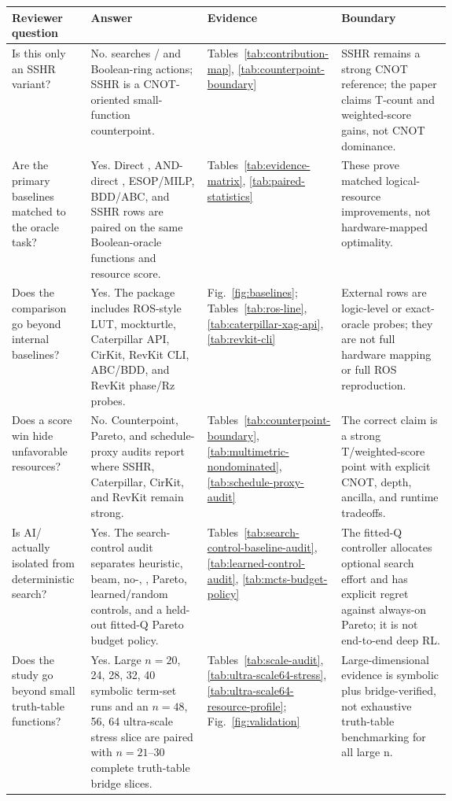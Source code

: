 \begin{tabularx}{\linewidth}{>{\raggedright\arraybackslash}p{0.18\linewidth}>{\raggedright\arraybackslash}X>{\raggedright\arraybackslash}p{0.22\linewidth}>{\raggedright\arraybackslash}p{0.25\linewidth}}
\toprule
Reviewer question & Answer & Evidence & Boundary \\
\midrule
Is this only an SSHR variant? & No. \method{} searches \anf{}/\fprm{} and Boolean-ring actions; SSHR is a CNOT-oriented small-function counterpoint. & Tables~\ref{tab:contribution-map}, \ref{tab:counterpoint-boundary} & SSHR remains a strong CNOT reference; the paper claims T-count and weighted-score gains, not CNOT dominance. \\
Are the primary baselines matched to the oracle task? & Yes. Direct \anf{}, AND-direct \anf{}, ESOP/MILP, BDD/ABC, and SSHR rows are paired on the same Boolean-oracle functions and resource score. & Tables~\ref{tab:evidence-matrix}, \ref{tab:paired-statistics} & These prove matched logical-resource improvements, not hardware-mapped optimality. \\
Does the comparison go beyond internal baselines? & Yes. The package includes ROS-style LUT, mockturtle, Caterpillar API, CirKit, RevKit CLI, ABC/BDD, and RevKit phase/Rz probes. & Fig.~\ref{fig:baselines}; Tables~\ref{tab:ros-line}, \ref{tab:caterpillar-xag-api}, \ref{tab:revkit-cli} & External rows are logic-level or exact-oracle probes; they are not full hardware mapping or full ROS reproduction. \\
Does a score win hide unfavorable resources? & No. Counterpoint, Pareto, and schedule-proxy audits report where SSHR, Caterpillar, CirKit, and RevKit remain strong. & Tables~\ref{tab:counterpoint-boundary}, \ref{tab:multimetric-nondominated}, \ref{tab:schedule-proxy-audit} & The correct claim is a strong T/weighted-score point with explicit CNOT, depth, ancilla, and runtime tradeoffs. \\
Is AI/\mcts{} actually isolated from deterministic search? & Yes. The search-control audit separates heuristic, beam, no-\mcts{}, \mcts{}, Pareto, learned/random controls, and a held-out fitted-Q Pareto budget policy. & Tables~\ref{tab:search-control-baseline-audit}, \ref{tab:learned-control-audit}, \ref{tab:mcts-budget-policy} & The fitted-Q controller allocates optional search effort and has explicit regret against always-on Pareto; it is not end-to-end deep RL. \\
Does the study go beyond small truth-table functions? & Yes. Large $n=20$, 24, 28, 32, 40 symbolic term-set runs and an $n=48$, 56, 64 ultra-scale stress slice are paired with $n=21$--$30$ complete truth-table bridge slices. & Tables~\ref{tab:scale-audit}, \ref{tab:ultra-scale64-stress}, \ref{tab:ultra-scale64-resource-profile}; Fig.~\ref{fig:validation} & Large-dimensional evidence is symbolic plus bridge-verified, not exhaustive truth-table benchmarking for all large n. \\
\bottomrule
\end{tabularx}
